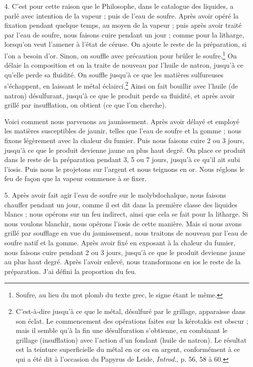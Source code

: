 \documentclass[landscape, a4paper, 11pt, oneside, polutonikogreek, french]{article}
\begin{document}
4. C'est pour cette raison que le Philosophe, dans le catalogue des liquides, a parlé avec intention de la vapeur ; puis de l'eau de soufre. Après avoir opéré la fixation pendant quelque temps, au moyen de la vapeur ; puis après avoir traité par l'eau de soufre, nous faisons cuire pendant un jour ; comme pour la litharge, lorsqu'on veut l'amener à l'état de céruse. On ajoute le reste de la préparation, si l'on a besoin d'or. Sinon, on souffle avec précaution pour brûler le soufre.\footnote{Soufre, au lieu du mot plomb du texte grec, le signe étant le même.} On délaie la composition et on la traite de nouveau par l'huile de natron, jusqu'à ce qu'elle perde sa fluidité. On souffle jusqu'à ce que les matières sulfureuses s'échappent, en laissant le métal éclairci.\footnote{C'est-à-dire jusqu'à ce que le métal, désulfuré par le grillage, apparaisse dans son éclat. Le commencement des opérations faites sur la kérotakis est obscur ; mais il semble qu'à la fin une désulfuration s'obtienne, en combinant le grillage (insufflation) avec l'action d'un fondant (huile de natron). Le résultat est la teinture superficielle du métal en or ou en argent, conformément à ce qui a été dit à l'occasion du Papyrus de Leide, \emph{Introd.}, p. 56, 58 à 60.} Ainsi on fait bouillir avec l'huile (de natron) désulfurant, jusqu'à ce que le produit perde sa fluidité, et après avoir grillé par insufflation, on obtient (ce que l'on cherche).

Voici comment nous parvenons au jaunissement. Après avoir délayé et employé les matières susceptibles de jaunir, telles que l'eau de soufre et la gomme ; nous fixons légèrement avec la chaleur du fumier. Puis nous faisons cuire 2 ou 3 jours, jusqu'à ce que le produit devienne jaune au plus haut degré. On place ce produit dans le reste de la préparation pendant 3, 5 ou 7 jours, jusqu'à ce qu'il ait subi l'iosis. Puis nous le projetons sur l'argent et nous teignons en or. Nous réglons le feu de façon que la vapeur commence à se fixer.

5. Après avoir fait agir l'eau de soufre sur le molybdochalque, nous faisons chauffer pendant un jour, comme il est dit dans la première classe des liquides blancs ; nous opérons sur un feu indirect, ainsi que cela se fait pour la litharge. Si nous voulons blanchir, nous opérons l'iosis de cette manière. Mais si nous avons grillé par soufflage en vue du jaunissement, nous traitons de nouveau par l'eau de soufre natif et la gomme. Après avoir fixé en exposant à la chaleur du fumier, nous faisons cuire pendant 2 ou 3 jours, jusqu'à ce que le produit devienne jaune au plus haut degré. Après l'avoir enlevé, nous transformons en ios le reste de la préparation. J'ai défini la proportion du feu.
\end{document}
